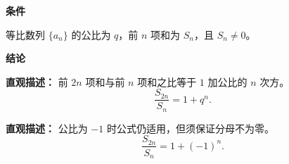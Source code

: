 \begin{statementbox}
	\textbf{\textcolor{CStatement}{条件}}
	\begin{description}[style=nextline, leftmargin=2.8em, labelsep=0.5em, itemsep=0.35em]
		\item[\textbf{\textcolor{CStatement}{条件 1（公比定义）：}}] 等比数列 $\{a_n\}$ 的公比为 $q$，前 $n$ 项和为 $S_n$，且 $S_n\neq 0$。
	\end{description}

	\textbf{\textcolor{CStatement}{结论}}
	\begin{description}[style=nextline, leftmargin=2.8em, labelsep=0.5em, itemsep=0.45em]
		\item[\textbf{\textcolor{CStatement}{结论一（片段比值）：}}]
			\textbf{\textcolor{CStatement}{直观描述：}}
			前 $2n$ 项和与前 $n$ 项和之比等于 $1$ 加公比的 $n$ 次方。
			\[
				\frac{S_{2n}}{S_n}=1+q^{n}.
			\]

		\item[\textbf{\textcolor{CStatement}{推广结论（公比负一情形）：}}]
			\textbf{\textcolor{CStatement}{直观描述：}}
			公比为 $-1$ 时公式仍适用，但须保证分母不为零。
			\[
				\frac{S_{2n}}{S_n}=1+(-1)^{n}.
			\]
	\end{description}
\end{statementbox}
